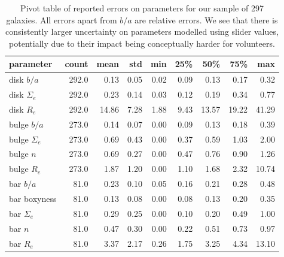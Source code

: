 \documentclass[../main.tex]{subfiles}
\begin{document}
\begin{table*}
  \centering
  \caption{Pivot table of reported errors on parameters for our sample of 297 galaxies. All errors apart from $b/a$ are relative errors. We see that there is consistently larger uncertainty on parameters modelled using slider values, potentially due to their impact being conceptually harder for volunteers.}
  \begin{tabular}{l|rrrrrrrr}
  \hline
  parameter &  count &  mean &   std &   min &   25\% &   50\% &   75\% &    max \\
  \hline
  disk $b/a$    &  292.0 &   0.13 &  0.05 &  0.02 &  0.09 &   0.13 &   0.17 &   0.32 \\
  disk $\Sigma_e$ &  292.0 &   0.23 &  0.14 &  0.03 &  0.12 &   0.19 &   0.34 &   0.77 \\
  disk $R_e$    &  292.0 &  14.86 &  7.28 &  1.88 &  9.43 &  13.57 &  19.22 &  41.29 \\
  bulge $b/a$   &  273.0 &   0.14 &  0.07 &  0.00 &  0.09 &   0.13 &   0.18 &   0.39 \\
  bulge $\Sigma_e$ &  273.0 &   0.69 &  0.43 &  0.00 &  0.37 &   0.59 &   1.03 &   2.00 \\
  bulge $n$     &  273.0 &   0.69 &  0.27 &  0.00 &  0.47 &   0.76 &   0.90 &   1.26 \\
  bulge $R_e$   &  273.0 &   1.87 &  1.20 &  0.00 &  1.10 &   1.68 &   2.32 &  10.74 \\
  bar $b/a$     &   81.0 &   0.23 &  0.10 &  0.05 &  0.16 &   0.21 &   0.28 &   0.48 \\
  bar boxyness  &   81.0 &   0.13 &  0.08 &  0.00 &  0.08 &   0.13 &   0.20 &   0.35 \\
  bar $\Sigma_e$ &   81.0 &   0.29 &  0.25 &  0.00 &  0.10 &   0.20 &   0.49 &   1.00 \\
  bar $n$       &   81.0 &   0.47 &  0.30 &  0.00 &  0.22 &   0.51 &   0.73 &   0.97 \\
  bar $R_e$     &   81.0 &   3.37 &  2.17 &  0.26 &  1.75 &   3.25 &   4.34 &  13.10 \\
  \hline
  \end{tabular}
  \label{table:error_values}
\end{table*}
\end{document}
